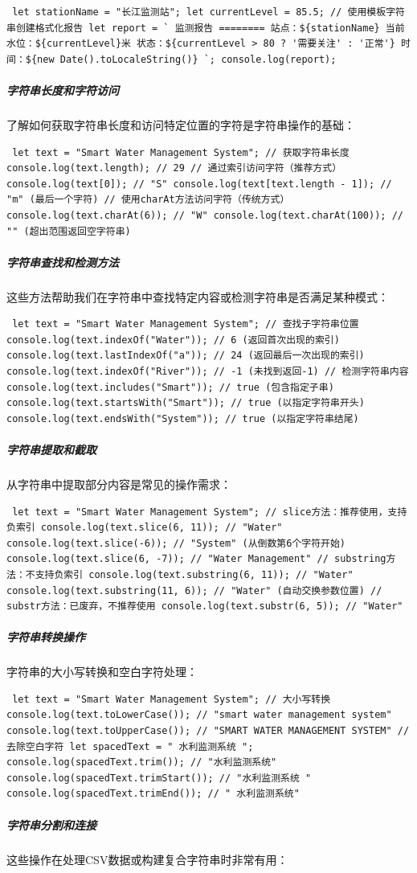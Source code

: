 \begin{verbatim} let stationName = "长江监测站"; let currentLevel = 85.5; // 使用模板字符串创建格式化报告 let report = ` 监测报告 ======== 站点：${stationName} 当前水位：${currentLevel}米 状态：${currentLevel > 80 ? '需要关注' : '正常'} 时间：${new Date().toLocaleString()} `; console.log(report); \end{verbatim} \subparagraph{字符串长度和字符访问}\label{ux5b57ux7b26ux4e32ux957fux5ea6ux548cux5b57ux7b26ux8bbfux95ee} 了解如何获取字符串长度和访问特定位置的字符是字符串操作的基础： \begin{verbatim} let text = "Smart Water Management System"; // 获取字符串长度 console.log(text.length); // 29 // 通过索引访问字符（推荐方式） console.log(text[0]); // "S" console.log(text[text.length - 1]); // "m" (最后一个字符) // 使用charAt方法访问字符（传统方式） console.log(text.charAt(6)); // "W" console.log(text.charAt(100)); // "" (超出范围返回空字符串) \end{verbatim} \subparagraph{字符串查找和检测方法}\label{ux5b57ux7b26ux4e32ux67e5ux627eux548cux68c0ux6d4bux65b9ux6cd5} 这些方法帮助我们在字符串中查找特定内容或检测字符串是否满足某种模式： \begin{verbatim} let text = "Smart Water Management System"; // 查找子字符串位置 console.log(text.indexOf("Water")); // 6 (返回首次出现的索引) console.log(text.lastIndexOf("a")); // 24 (返回最后一次出现的索引) console.log(text.indexOf("River")); // -1 (未找到返回-1) // 检测字符串内容 console.log(text.includes("Smart")); // true (包含指定子串) console.log(text.startsWith("Smart")); // true (以指定字符串开头) console.log(text.endsWith("System")); // true (以指定字符串结尾) \end{verbatim} \subparagraph{字符串提取和截取}\label{ux5b57ux7b26ux4e32ux63d0ux53d6ux548cux622aux53d6} 从字符串中提取部分内容是常见的操作需求： \begin{verbatim} let text = "Smart Water Management System"; // slice方法：推荐使用，支持负索引 console.log(text.slice(6, 11)); // "Water" console.log(text.slice(-6)); // "System" (从倒数第6个字符开始) console.log(text.slice(6, -7)); // "Water Management" // substring方法：不支持负索引 console.log(text.substring(6, 11)); // "Water" console.log(text.substring(11, 6)); // "Water" (自动交换参数位置) // substr方法：已废弃，不推荐使用 console.log(text.substr(6, 5)); // "Water" \end{verbatim} \subparagraph{字符串转换操作}\label{ux5b57ux7b26ux4e32ux8f6cux6362ux64cdux4f5c} 字符串的大小写转换和空白字符处理： \begin{verbatim} let text = "Smart Water Management System"; // 大小写转换 console.log(text.toLowerCase()); // "smart water management system" console.log(text.toUpperCase()); // "SMART WATER MANAGEMENT SYSTEM" // 去除空白字符 let spacedText = " 水利监测系统 "; console.log(spacedText.trim()); // "水利监测系统" console.log(spacedText.trimStart()); // "水利监测系统 " console.log(spacedText.trimEnd()); // " 水利监测系统" \end{verbatim} \subparagraph{字符串分割和连接}\label{ux5b57ux7b26ux4e32ux5206ux5272ux548cux8fdeux63a5} 这些操作在处理CSV数据或构建复合字符串时非常有用： 